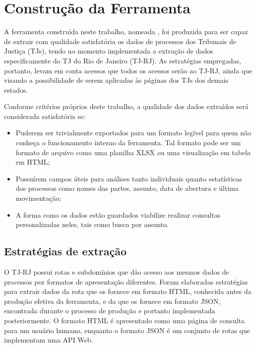 \chapter{Construção da Ferramenta \tjscraper~\label{chp:construção-da-ferramenta}}

A ferramenta construída neste trabalho, nomeada \textbf{\tjscraper}, foi
produzida para ser capaz de extrair com qualidade satisfatória os dados de
processos dos Tribunais de Justiça (TJs), tendo no momento implementada a
extração de dados especificamente do TJ do Rio de Janeiro (TJ-RJ). As
estratégias empregadas, portanto, levam em conta acessos que todos os acessos
serão ao TJ-RJ, ainda que visando a possibilidade de serem aplicadas às páginas
dos TJs dos demais estados.

Conforme critérios próprios deste trabalho, a qualidade dos dados extraídos
será considerada satisfatória se:

\begin{itemize}
    \item Puderem ser trivialmente exportados para um formato legível para quem
        não conheça o funcionamento interno da ferramenta. Tal formato pode ser
        um formato de arquivo como uma planilha XLSX ou uma visualização em
        tabela em HTML;
    \item Possuírem campos úteis para análises tanto individuais quanto
        estatísticas dos processos como nomes das partes, assunto, data de
        abertura e última movimentação;
    \item A forma como os dados estão guardados viabilize realizar consultas
        personalizadas neles, tais como busca por assunto.
\end{itemize}

\section{Estratégias de extração}

O TJ-RJ possui rotas e subdomínios que dão acesso aos mesmos dados de processos
por formatos de apresentação diferentes. Foram elaboradas estratégias para
extrair dados da rota que os fornece em formato HTML, conhecida antes da
produção efetiva da ferramenta, e da que os fornece em formato JSON, encontrada
durante o processo de produção e portanto implementada posteriormente. O
formato HTML é apresentado como uma página de consulta para um usuário humano,
enquanto o formato JSON é um conjunto de rotas que implementam uma API Web.


